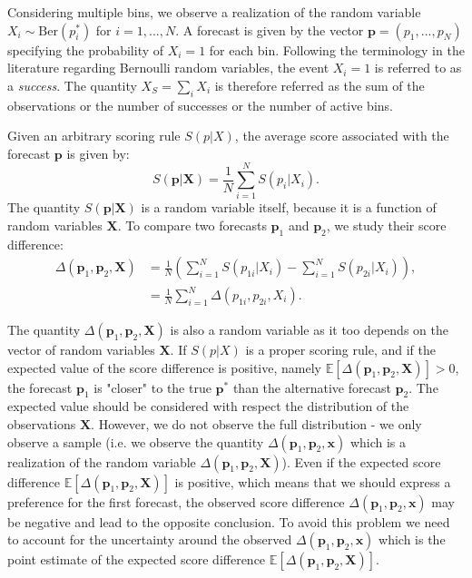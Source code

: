 \documentclass[referee,sn-basic]{sn-jnl}
\theoremstyle{thmstyleone}%
\theoremstyle{thmstyletwo}%
\theoremstyle{thmstylethree}%
\begin{document}
Considering multiple bins, we observe a realization of the random variable $X_i \sim \text{Ber}(p^*_i)$ for $i = 1,...,N$. A forecast is given by the vector $\mathbf p = (p_1,...,p_N)$ specifying the probability of $X_i = 1$ for each bin. Following the terminology in the literature regarding Bernoulli random variables, the event $X_i = 1$ is referred to as a \emph{success}. The quantity $X_S = \sum_i X_i$ is therefore referred as the sum of the observations or the number of successes or the number of active bins.

Given an arbitrary scoring rule $S(p\vert X)$, the average score associated with the forecast $\mathbf p$ is given by:
$$
S(\mathbf p\vert \mathbf X) = \frac{1}{N}\sum_{i = 1}^N S(p_i \vert  X_i).  
$$
The quantity $S(\mathbf p \vert  \mathbf X)$ is a random variable itself, because it is a function of random variables $\mathbf X$. To compare two forecasts $\mathbf p_1$ and $\mathbf p_2$, we study their score difference:
$$
\begin{aligned}
\Delta(\mathbf p_1, \mathbf p_2, \mathbf X) &= \frac{1}{N} \left(\sum_{i = 1}^N S(p_{1i} \vert  X_i) - \sum_{i = 1}^N S(p_{2i} \vert  X_i)\right), \\
&= \frac{1}{N}\sum_{i = 1}^N \Delta(p_{1i}, p_{2i}, X_i).
\end{aligned}
$$

The quantity $\Delta(\mathbf p_1, \mathbf p_2, \mathbf X)$ is also a random variable as it too depends on the vector of random variables $\mathbf X$. If $S(p\vert X)$ is a proper scoring rule, and if the expected value of the score difference is positive, namely $\mathbb E[\Delta(\mathbf p_1, \mathbf p_2, \mathbf X)] > 0$, the forecast $\mathbf p_1$ is "closer" to the true $\mathbf p^*$ than the alternative forecast $\mathbf p_2$. The expected value should be considered with respect the distribution of the observations $\mathbf X$. However, we do not observe the full distribution - we only observe a sample (i.e. we observe the quantity $\Delta(\mathbf p_1, \mathbf p_2, \mathbf x)$ which is a realization of the random variable $\Delta(\mathbf p_1, \mathbf p_2, \mathbf X)$). Even if the expected score difference $\mathbb E[\Delta(\mathbf p_1, \mathbf p_2, \mathbf X)]$ is positive, which means that we should express a preference for the first forecast, the observed score difference $\Delta(\mathbf p_1, \mathbf p_2, \mathbf x)$ may be negative and lead to the opposite conclusion. To avoid this problem we need to account for the uncertainty around the observed $\Delta(\mathbf p_1, \mathbf p_2, \mathbf x)$ which is the point estimate of the expected score difference $\mathbb E[\Delta(\mathbf p_1, \mathbf p_2, \mathbf X)]$. 
\end{document}
